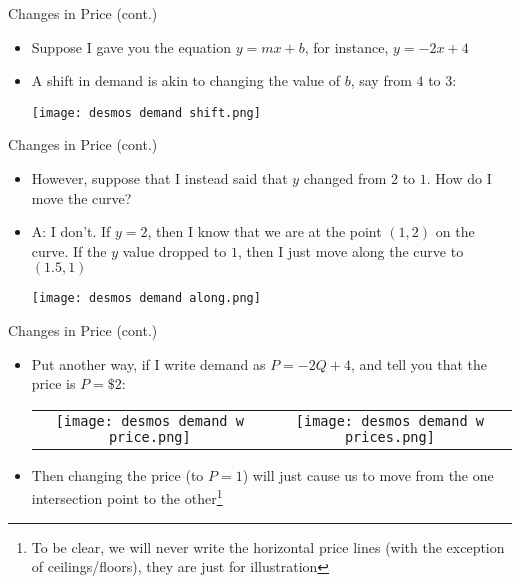\documentclass[10pt,xcolor={svgnames}]{beamer}
\begin{document}
\begin{frame}{Changes in Price (cont.)}
    \begin{itemize}
        \item Suppose I gave you the equation $y=mx+b$, for instance, $y=-2x+4$
        \item A shift in demand is akin to changing the value of $b$, say from $4$ to $3$:
        \begin{center}
            \texttt{[image: desmos demand shift.png]}
        \end{center}
    \end{itemize}
\end{frame}

\begin{frame}{Changes in Price (cont.)}
    \begin{itemize}[<+->]
        \item However, suppose that I instead said that $y$ changed from $2$ to $1$. How do I move the curve?
        \item A: I don't. If $y=2$, then I know that we are at the point $(1,2)$ on the curve. If the $y$ value dropped to $1$, then I just move along the curve to $(1.5,1)$
        \begin{center}
            \texttt{[image: desmos demand along.png]}
        \end{center}
    \end{itemize}
\end{frame}

\begin{frame}{Changes in Price (cont.)}
    \begin{itemize}
        \item Put another way, if I write demand as $P=-2Q+4$, and tell you that the price is $P=\$2$:
        \begin{table}[H]
            \centering
            \begin{tabular}{cc}
                \texttt{[image: desmos demand w price.png]} &\pause
                \texttt{[image: desmos demand w prices.png]}
            \end{tabular}
        \end{table}
        \item<2-> Then changing the price (to $P=1$) will just cause us to move from the one intersection point to the other\footnote{\vspace{2mm}To be clear, we will never write the horizontal price lines (with the exception of ceilings/floors), they are just for illustration}
    \end{itemize}
\end{frame}
\end{document}
